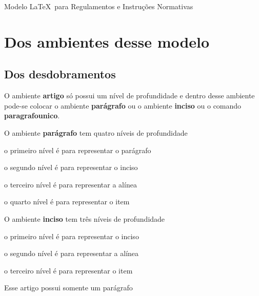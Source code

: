 \documentclass[11pt,twoside,a4paper]{inifsc}
\begin{document}
\begin{normativa}{Modelo \LaTeX~para Regulamentos e Instruções Normativas}
\chapter{Dos ambientes desse modelo}

\section{Dos desdobramentos}

\begin{artigo}
    \item O ambiente \textbf{artigo} só possui um nível de profundidade e dentro desse ambiente pode-se colocar o ambiente \textbf{parágrafo} ou o ambiente \textbf{inciso} ou o comando \textbf{paragrafounico}.
    \item \label{art:comparagrafoaserref}
    O ambiente \textbf{parágrafo} tem quatro níveis de profundidade
    \begin{paragrafo}
        \item \label{par:nivelparagrafo}
        o primeiro nível é para representar o parágrafo
        \begin{paragrafo}
            \item \label{inc:segnivelparagrafo}
             o segundo nível é para representar o inciso
            \begin{paragrafo}
                \item \label{ali:ternivelparagrafo}
                o terceiro nível é para representar a alínea
                \begin{paragrafo}
                    \item o quarto nível é para representar o item
                \end{paragrafo}
            \end{paragrafo}
        \end{paragrafo}
    \end{paragrafo}

    \item O ambiente \textbf{inciso} tem três níveis de profundidade
    \begin{inciso}
        \item o primeiro nível é para representar o inciso
        \begin{inciso}
            \item o segundo nível é para representar a alínea
            \begin{inciso}
                \item o terceiro nível é para representar o item
            \end{inciso}
        \end{inciso}
    \end{inciso}
    \item Esse artigo possui somente um parágrafo
\end{artigo}




\end{normativa}
\end{document}
